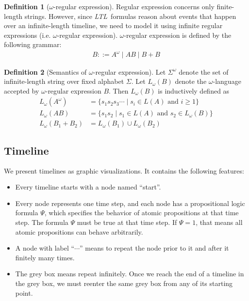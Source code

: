 \documentclass[preprint,12pt]{elsarticle}
\theoremstyle{definition}
\newtheorem{definition}{Definition}[section]
\theoremstyle{remark}
\newcommand{\ltl}{\textit{LTL}}
\begin{document}
\begin{definition}[$\omega$-regular expression]
    Regular expression concerns only finite-length strings. However, since \ltl\ formulas reason about events that happen over an infinite-length timeline, we need to model it using infinite regular expressions (i.e. $\omega$-regular expression). $\omega$-regular expression is defined by the following grammar:
    \begin{align*}
        B ::= A^{\omega} \mid AB \mid B + B
    \end{align*}
\end{definition}
\begin{definition}[Semantics of $\omega$-regular expression]\label{def:omega-semantics}
    Let $\Sigma^{\omega}$ denote the set of infinite-length string over fixed alphabet $\Sigma$. Let $L_{\omega}(B)$ denote the $\omega$-language accepted by $\omega$-regular expression $B$. Then $L_{\omega}(B)$ is inductively defined as
    \begin{align*}
        L_{\omega}(A^{\omega}) & = \{s_1s_2s_3\cdots \mid s_i \in L(A) \text{ and } i \ge 1\} \\
        L_{\omega}(AB) & = \{s_1s_2 \mid s_1 \in L(A) \text{ and } s_2 \in L_{\omega}(B)\} \\
        L_{\omega}(B_1 + B_2) &= L_{\omega}(B_1) \cup L_{\omega}(B_2)
    \end{align*}
\end{definition}

\subsection{Timeline}
We present timelines as graphic visualizations. It contains the following features:
\begin{itemize}
    \item Every timeline starts with a node named ``start''.
    \item Every node represents one time step, and each node has a propositional logic formula $\Psi$, which specifies the behavior of atomic propositions at that time step. The formula $\Psi$ must be true at that time step. If $\Psi = 1$, that means all atomic propositions can behave arbitrarily.
    \item A node with label ``$\cdots$'' means to repeat the node prior to it and after it finitely many times.
    \item The grey box means repeat infinitely. Once we reach the end of a timeline in the grey box, we must reenter the same grey box from any of its starting point.
\end{itemize}
\end{document}

